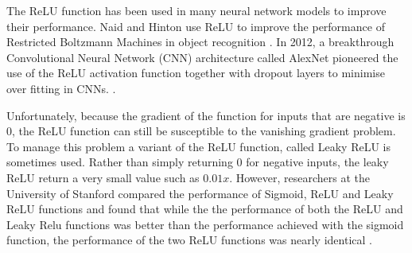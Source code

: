The ReLU function has been used in many neural network models to improve their performance. Naid and Hinton use ReLU to improve the performance of Restricted Boltzmann Machines in object recognition \cite{Nair2010}. In 2012, a breakthrough Convolutional Neural Network (CNN) architecture called AlexNet pioneered the use of the ReLU activation function together with dropout layers to minimise over fitting in CNNs. \newline \cite{KrizhevskyAlex2017Icwd}. 

Unfortunately, because the gradient of the function for inputs that are negative is $0$, the ReLU function can still be susceptible to the vanishing gradient problem. To manage this problem a variant of the ReLU function, called Leaky ReLU is sometimes used. Rather than simply returning 0 for negative inputs, the leaky ReLU return a very small value such as $0.01x$. However, researchers at the University of Stanford compared the performance of Sigmoid, ReLU and Leaky ReLU functions and found that while the the performance of both the ReLU and Leaky Relu functions was better than the performance achieved with the sigmoid function, the performance of the two ReLU functions was nearly identical \newline \cite{maas2013rectifier}.
